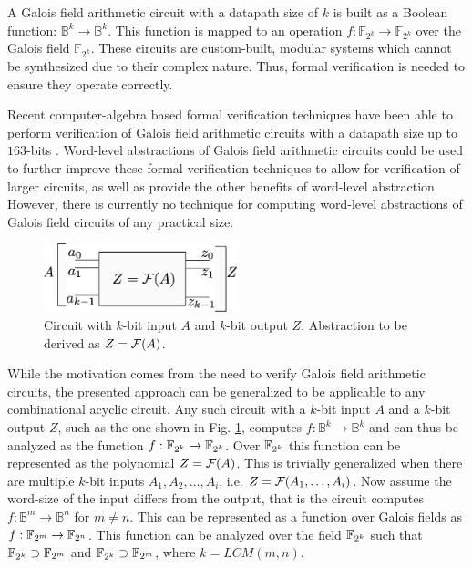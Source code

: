 A Galois field arithmetic circuit with a datapath size of $k$ 
is built as a Boolean function: $\mathbb{B}^k \rightarrow \mathbb{B}^k$. 
This function is mapped to an operation 
$f:\mathbb{F}_{2^k} \rightarrow \mathbb{F}_{2^k}$ 
over the Galois field $\mathbb{F}_{2^k}$. 
These circuits are custom-built, modular
systems which cannot be synthesized due to their complex nature. Thus, 
formal verification is needed to ensure they operate correctly.

Recent computer-algebra based formal verification techniques have been
able to perform verification of Galois field arithmetic circuits with
a datapath size up to $163$-bits \cite{lv:phd}. Word-level abstractions 
of Galois
field arithmetic circuits could be used to further improve these formal 
verification techniques to allow for verification of larger circuits, as
well as provide the other benefits of word-level abstraction.
However, there is currently no technique for computing word-level 
abstractions of Galois field circuits of any practical size.

{
\begin{figure}[h]
\centerline{
\includegraphics[width=0.5\textwidth]{./figures/interpolate}
}
\caption{Circuit with $k$-bit input $A$ and $k$-bit output $Z$. 
Abstraction to be derived as $Z={\mathcal{F}}(A)$.}
\label{fig:abstractA_Z}
\end{figure}
}

While the motivation comes from the need to verify Galois field arithmetic
circuits, the presented approach can be generalized to be applicable to any
combinational acyclic circuit.
Any such circuit with a $k$-bit input $A$ and a $k$-bit output $Z$, such
as the one shown in Fig. \ref{fig:abstractA_Z}, computes 
$f: \mathbb{B}^k \rightarrow \mathbb{B}^k$ and can thus be analyzed as the
function $f: {\mathbb{F}}_{2^k} \rightarrow {\mathbb{F}}_{2^k}$. Over ${\mathbb{F}}_{2^k}$ this function can be 
represented as the polynomial $Z={\mathcal{F}}(A)$. This is trivially generalized
when there are multiple $k$-bit inputs $A_1,A_2,\dots,A_i$, i.e. $Z={\mathcal{F}}(A_1,\dots,A_i)$.
Now assume the word-size of the input differs from the output, that is the circuit
computes $f: \mathbb{B}^m \rightarrow \mathbb{B}^n$ for $m \neq n$. This can 
be represented as a function over Galois fields as $f: {\mathbb{F}}_{2^m} \rightarrow {\mathbb{F}}_{2^n}$.
This function can be analyzed over the field ${\mathbb{F}}_{2^k}$ such that ${\mathbb{F}}_{2^k} \supset {\mathbb{F}}_{2^m}$ 
and ${\mathbb{F}}_{2^k} \supset {\mathbb{F}}_{2^m}$, where $k=LCM(m,n)$.

